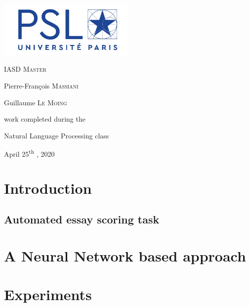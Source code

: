 \documentclass[a4paper,12pt,english]{article}
\begin{document}
\begin{titlepage}
	\centering
	\fbox{\begin{minipage}{\textwidth}
	\centering
	\vspace{0.3cm}
    {\scshape\LARGE\bfseries Project Report\par}
	\vspace{0.2cm}
	{\Large\bfseries Automated Essay Scoring \par}
	\vspace{0.3cm}
    \end{minipage}}
	
	\vfill
	\includegraphics[width=0.5\textwidth]{fig/psl.jpg}\par\vspace{0cm}
	{\scshape\Large IASD Master \par}
	\vfill
	{\Large Pierre-François \textsc{Massiani}\par}
	{\Large Guillaume \textsc{Le Moing}\par}
	\vfill
	work completed during the\par
	Natural Language Processing class
	\vfill
    {\large April 25\textsuperscript{th}  , 2020\par}
\end{titlepage}
\tableofcontents
\newpage

\section{Introduction}

\subsection{Automated essay scoring task}

\section{A Neural Network based approach}

\section{Experiments}
\end{document}
